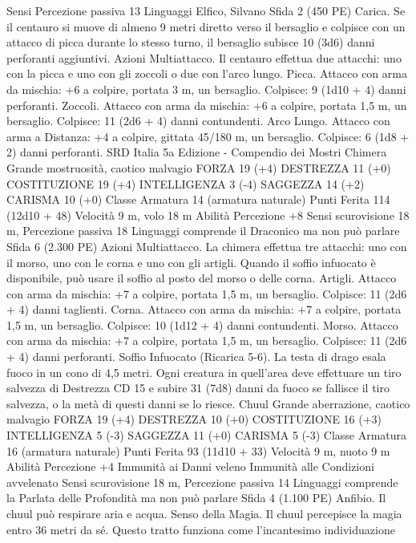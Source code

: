 \begin{multicols}{2}
Sensi Percezione passiva 13
Linguaggi Elfico, Silvano
Sfida 2 (450 PE)
Carica. Se il centauro si muove di almeno 9 metri diretto verso il
bersaglio e colpisce con un attacco di picca durante lo stesso
turno, il bersaglio subisce 10 (3d6) danni perforanti aggiuntivi.
Azioni
Multiattacco. Il centauro effettua due attacchi: uno con la picca e
uno con gli zoccoli o due con l’arco lungo.
Picca. Attacco con arma da mischia: +6 a colpire, portata 3 m,
un bersaglio.
Colpisce: 9 (1d10 + 4) danni perforanti.
Zoccoli. Attacco con arma da mischia: +6 a colpire, portata 1,5
m, un bersaglio.
Colpisce: 11 (2d6 + 4) danni contundenti.
Arco Lungo. Attacco con arma a Distanza: +4 a colpire, gittata
45/180 m, un bersaglio.
Colpisce: 6 (1d8 + 2) danni perforanti.
SRD Italia 5a Edizione - Compendio dei Mostri
Chimera
Grande mostruosità, caotico malvagio
FORZA 19 (+4)
DESTREZZA 11 (+0)
COSTITUZIONE 19 (+4)
INTELLIGENZA 3 (-4)
SAGGEZZA 14 (+2)
CARISMA 10 (+0)
Classe Armatura 14 (armatura naturale)
Punti Ferita 114 (12d10 + 48)
Velocità 9 m, volo 18 m
Abilità Percezione +8
Sensi scurovisione 18 m, Percezione passiva 18
Linguaggi comprende il Draconico ma non può parlare
Sfida 6 (2.300 PE)
Azioni
Multiattacco. La chimera effettua tre attacchi: uno con il morso,
uno con le corna e uno con gli artigli. Quando il soffio infuocato
è disponibile, può usare il soffio al posto del morso o delle corna.
Artigli. Attacco con arma da mischia: +7 a colpire, portata 1,5
m, un bersaglio.
Colpisce: 11 (2d6 + 4) danni taglienti.
Corna. Attacco con arma da mischia: +7 a colpire, portata 1,5 m,
un bersaglio.
Colpisce: 10 (1d12 + 4) danni contundenti.
Morso. Attacco con arma da mischia: +7 a colpire, portata 1,5
m, un bersaglio.
Colpisce: 11 (2d6 + 4) danni perforanti.
Soffio Infuocato (Ricarica 5-6). La testa di drago esala fuoco in
un cono di 4,5 metri. Ogni creatura in quell’area deve effettuare
un tiro salvezza di Destrezza CD 15 e subire 31 (7d8) danni da
fuoco se fallisce il tiro salvezza, o la metà di questi danni se lo
riesce.
Chuul
Grande aberrazione, caotico malvagio
FORZA 19 (+4)
DESTREZZA 10 (+0)
COSTITUZIONE 16 (+3)
INTELLIGENZA 5 (-3)
SAGGEZZA 11 (+0)
CARISMA 5 (-3)
Classe Armatura 16 (armatura naturale)
Punti Ferita 93 (11d10 + 33)
Velocità 9 m, nuoto 9 m
Abilità Percezione +4
Immunità ai Danni veleno
Immunità alle Condizioni avvelenato
Sensi scurovisione 18 m, Percezione passiva 14
Linguaggi comprende la Parlata delle Profondità ma non può
parlare
Sfida 4 (1.100 PE)
Anfibio. Il chuul può respirare aria e acqua.
Senso della Magia. Il chuul percepisce la magia entro 36 metri
da sé. Questo tratto funziona come l’incantesimo individuazione

\end{multicols}
